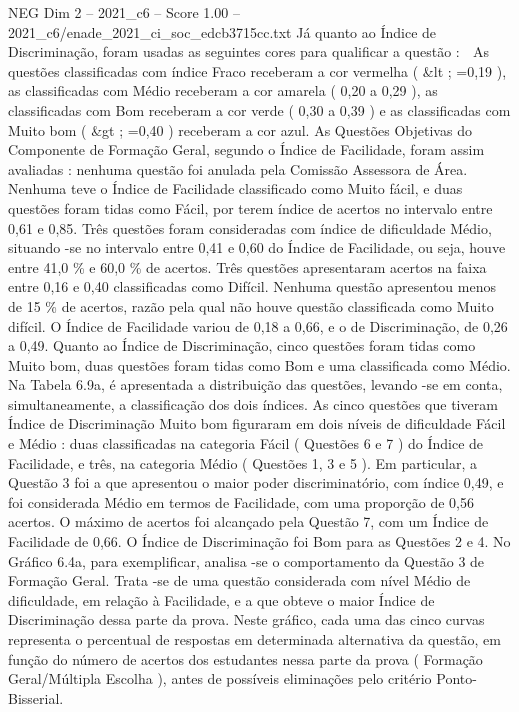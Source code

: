 \begin{textsample}{NEG Dim 2 – 2021\_c6 – Score 1.00 – 2021\_c6/enade\_2021\_ci\_soc\_edcb3715cc.txt}
Já quanto ao Índice de Discriminação, foram usadas as seguintes cores para qualificar a questão :  As questões classificadas com índice Fraco receberam a cor vermelha ( \&lt ; =0,19 ), as classificadas com Médio receberam a cor amarela ( 0,20 a 0,29 ), as classificadas com Bom receberam a cor verde ( 0,30 a 0,39 ) e as classificadas com Muito bom ( \&gt ; =0,40 ) receberam a cor azul.
As Questões Objetivas do Componente de Formação Geral, segundo o Índice de Facilidade, foram assim avaliadas : nenhuma questão foi anulada pela Comissão Assessora de Área.
Nenhuma teve o Índice de Facilidade classificado como Muito fácil, e duas questões foram tidas como Fácil, por terem índice de acertos no intervalo entre 0,61 e 0,85.
Três questões foram consideradas com índice de dificuldade Médio, situando -se no intervalo entre 0,41 e 0,60 do Índice de Facilidade, ou seja, houve entre 41,0 \% e 60,0 \% de acertos.
Três questões apresentaram acertos na faixa entre 0,16 e 0,40 classificadas como Difícil.
Nenhuma questão apresentou menos de 15 \% de acertos, razão pela qual não houve questão classificada como Muito difícil.
O Índice de Facilidade variou de 0,18 a 0,66, e o de Discriminação, de 0,26 a 0,49.
Quanto ao Índice de Discriminação, cinco questões foram tidas como Muito bom, duas questões foram tidas como Bom e uma classificada como Médio.
Na Tabela 6.9a, é apresentada a distribuição das questões, levando -se em conta, simultaneamente, a classificação dos dois índices.
As cinco questões que tiveram Índice de Discriminação Muito bom figuraram em dois níveis de dificuldade Fácil e Médio : duas classificadas na categoria Fácil ( Questões 6 e 7 ) do Índice de Facilidade, e três, na categoria Médio ( Questões 1, 3 e 5 ).
Em particular, a Questão 3 foi a que apresentou o maior poder discriminatório, com índice 0,49, e foi considerada Médio em termos de Facilidade, com uma proporção de 0,56 acertos.
O máximo de acertos foi alcançado pela Questão 7, com um Índice de Facilidade de 0,66.
O Índice de Discriminação foi Bom para as Questões 2 e 4.
No Gráfico 6.4a, para exemplificar, analisa -se o comportamento da Questão 3 de Formação Geral.
Trata -se de uma questão considerada com nível Médio de dificuldade, em relação à Facilidade, e a que obteve o maior Índice de Discriminação dessa parte da prova.
Neste gráfico, cada uma das cinco curvas representa o percentual de respostas em determinada alternativa da questão, em função do número de acertos dos estudantes nessa parte da prova ( Formação Geral/Múltipla Escolha ), antes de possíveis eliminações pelo critério Ponto-Bisserial.

\end{textsample}
